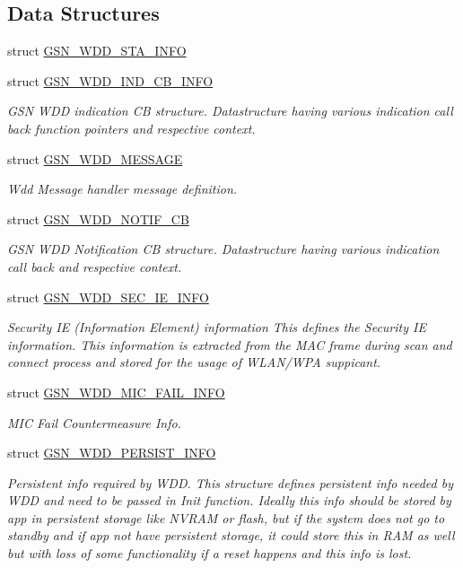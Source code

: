 \subsection*{Data Structures}
\begin{DoxyCompactItemize}
\item 
struct \hyperlink{a00299}{GSN\_\-WDD\_\-STA\_\-INFO}
\item 
struct \hyperlink{a00275}{GSN\_\-WDD\_\-IND\_\-CB\_\-INFO}
\begin{DoxyCompactList}\small\item\em GSN WDD indication CB structure. Datastructure having various indication call back function pointers and respective context. \end{DoxyCompactList}\item 
struct \hyperlink{a00277}{GSN\_\-WDD\_\-MESSAGE}
\begin{DoxyCompactList}\small\item\em Wdd Message handler message definition. \end{DoxyCompactList}\item 
struct \hyperlink{a00281}{GSN\_\-WDD\_\-NOTIF\_\-CB}
\begin{DoxyCompactList}\small\item\em GSN WDD Notification CB structure. Datastructure having various indication call back and respective context. \end{DoxyCompactList}\item 
struct \hyperlink{a00292}{GSN\_\-WDD\_\-SEC\_\-IE\_\-INFO}
\begin{DoxyCompactList}\small\item\em Security IE (Information Element) information This defines the Security IE information. This information is extracted from the MAC frame during scan and connect process and stored for the usage of WLAN/WPA suppicant. \end{DoxyCompactList}\item 
struct \hyperlink{a00278}{GSN\_\-WDD\_\-MIC\_\-FAIL\_\-INFO}
\begin{DoxyCompactList}\small\item\em MIC Fail Countermeasure Info. \end{DoxyCompactList}\item 
struct \hyperlink{a00282}{GSN\_\-WDD\_\-PERSIST\_\-INFO}
\begin{DoxyCompactList}\small\item\em Persistent info required by WDD. This structure defines persistent info needed by WDD and need to be passed in Init function. Ideally this info should be stored by app in persistent storage like NVRAM or flash, but if the system does not go to standby and if app not have persistent storage, it could store this in RAM as well but with loss of some functionality if a reset happens and this info is lost. \end{DoxyCompactList}\item 

\end{DoxyCompactItemize}
